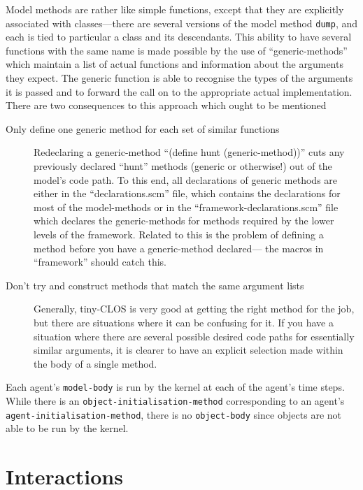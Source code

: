Model methods are rather like simple functions, except that they are
explicitly associated with classes---there are several versions of
the model method \texttt{dump}, and each is tied to particular a class
and its descendants.  This ability to have several functions with the same
name is made possible by the use of ``generic-methods'' which
maintain a list of actual functions and information about the
arguments they expect.  The generic function is able to 
recognise the types of the arguments it is passed and to forward the
call on to the appropriate actual implementation.  There are two
consequences to this approach which ought to be mentioned
\begin{description}
  \item[Only define one generic method for each set of similar
    functions] Redeclaring a generic-method ``(define hunt
    (generic-method))'' cuts any previously declared ``hunt'' methods
    (generic or otherwise!) out of the model's code path. To this end,
    all declarations of generic methods are either in the
    ``declarations.scm'' file, which contains the declarations for
    most of the model-methods or in the ``framework-declarations.scm''
    file which declares the generic-methods for methods required by
    the lower levels of the framework.  Related to this is the problem
    of defining a method before you have a generic-method declared---
    the macros in ``framework'' should catch this.
  \item[Don't try and construct methods that match the same argument
    lists] Generally, tiny-CLOS is very good at getting the right
    method for the job, but there are situations where it can be
    confusing for it.  If you have a situation where there are several
    possible desired code paths for essentially similar arguments, it
    is clearer to have an explicit selection made within the body of a
    single method.
\end{description}
 
Each agent's \texttt{model-body} is run by the kernel at each of the
agent's time steps. While there is an
\texttt{object-initialisation-method} corresponding to an agent's
\texttt{agent-initialisation-method}, there is no \texttt{object-body}
since objects are not able to be run by the kernel.

\section{Interactions}\label{interactions}

